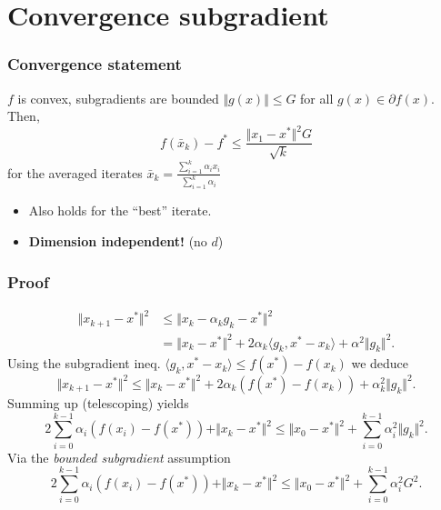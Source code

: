 \documentclass{beamer}
\begin{document}
\section{Convergence subgradient}%
\label{sec:}

\begin{frame}
  \frametitle{Convergence statement}
  \begin{theorem}
    $f$ is convex, subgradients are bounded $\Vert g(x) \Vert \le G$ for all $g(x)\in \partial f(x)$. Then,
    \begin{equation}
      f(\bar{x}_k) - f^* \le \frac{\Vert x_1-x^*\Vert^2 G}{\sqrt{k}}
    \end{equation}
    for the averaged iterates $\bar{x}_k = \frac{\sum_{i=1}^{k} \alpha_i x_i }{\sum_{i=1}^{k} \alpha_i}$
  \end{theorem}
  \begin{itemize}
    \item Also holds for the ``best'' iterate.
    \item \textbf{Dimension independent!} (no $d$)
  \end{itemize}
\end{frame}

\begin{frame}
  \frametitle{Proof}
  \vspace{-0.5cm}
  \begin{equation}
    \begin{aligned}
      \Vert x_{k+1} - x^* \Vert^2 &\le \Vert x_k - \alpha_k g_k - x^* \Vert^2 \\
      &= \Vert x_k-x^* \Vert^2 + 2 \alpha_k \langle g_k, x^*-x_k \rangle + \alpha^2 \Vert g_k \Vert^2.
    \end{aligned}
  \end{equation}
  Using the subgradient ineq. $\langle g_k , x^* -x_k \rangle \le f(x^*) - f(x_k)$
  we deduce
  \begin{equation}
    \Vert x_{k+1} - x^* \Vert^2 \le \Vert x_k-x^* \Vert^2 + 2 \alpha_k(f(x^*) - f(x_k)) + \alpha_k^2 \Vert g_k \Vert^2.
  \end{equation}
  Summing up (telescoping) yields
  \begin{equation}
    \label{eq:telescoping}
    2\sum_{i=0}^{k-1}  \alpha_i(f(x_i) - f(x^*)) + \Vert x_{k} - x^* \Vert^2 \le \Vert x_0-x^* \Vert^2 +  \sum_{i=0}^{k-1} \alpha_i^2 \Vert g_k \Vert^2.
  \end{equation}
  Via the \emph{bounded subgradient} assumption
  \begin{equation}
    2\sum_{i=0}^{k-1}  \alpha_i(f(x_i) - f(x^*)) + \Vert x_{k} - x^* \Vert^2 \le \Vert x_0-x^* \Vert^2 +  \sum_{i=0}^{k-1} \alpha_i^2 G^2.
  \end{equation}
\end{frame}
\end{document}
